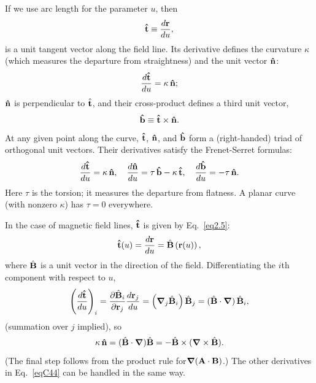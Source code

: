 \documentclass[aps,prb,twocolumn,groupedaddress,noshowpacs,checklength,amsmath]{revtex4-1}
\newcommand{\grad}{\mbox{\boldmath $\nabla$}}
\def\nhat{{\bf \hat n}}
\def\that{{\bf \hat t}}
\def\bhat{{\bf \hat b}}
\begin{document}
If we use arc length for the parameter $u$, then
\begin{equation}
\that \equiv \frac{d{\bf r}}{du},\label{eqC41}
\end{equation}
is a unit tangent vector along the field line.  Its derivative defines the curvature $\kappa$ (which measures the departure from straightness) and the unit vector $\nhat$:\cite{ATUV}
\begin{equation}
\frac{d\that}{du} = \kappa\,\nhat;\label{eqC42}
\end{equation}
$\nhat$ is perpendicular to $\hat {\bf t}$, and their cross-product defines a third unit vector,
\begin{equation}
\bhat \equiv \that \times \nhat.\label{eqC43}
\end{equation}
At any given point along the curve, $\that$, $\nhat$, and $\bhat$ form a (right-handed) triad of orthogonal unit vectors.  Their derivatives satisfy the Frenet-Serret formulas:\cite{TFSF}
\begin{equation}
\frac{d\that}{du} = \kappa\,\nhat,\quad \frac{d\nhat}{du} = \tau\, \bhat -\kappa \, \that,\quad \frac{d\bhat}{du} = -\tau \,\nhat.\label{eqC44}
\end{equation}
Here $\tau$ is the torsion; it measures the departure from flatness.  A planar curve (with nonzero $\kappa$) has $\tau = 0$ everywhere.

In the case of magnetic field lines, $\that$ is given by Eq.~\ref{eq2.5}:
\begin{equation}
\that(u) = \frac{d{\bf r}}{du} = \hat{\bf B}\left({\bf r}(u)\right),\label{eqC45}
\end{equation}
where $\hat{\bf B}$ is a unit vector in the direction of the field.  Differentiating the $i$th component with respect to $u$,
\begin{equation}
\left(\frac {d\that}{du}\right)_i = \frac{\partial\hat{\bf B}_i}{\partial{\bf r}_j}\frac{d{\bf r}_j}{du} = \left(\grad_j \hat{\bf B}_i\right)\hat{\bf B}_j = (\hat {\bf B} \cdot \grad)\,\hat {\bf B}_i,\label{eqC46}
\end{equation}
(summation over $j$ implied), so
\begin{equation}
\kappa\,\nhat = (\hat{\bf B}\cdot \grad)\hat {\bf B} = -\hat{\bf B} \times(\grad \times \hat{\bf B}).\label{eqC47}
\end{equation}
(The final step follows from the product rule for\linebreak $\grad({\bf A}\cdot {\bf B})$.)  The other derivatives in Eq.~\ref{eqC44} can be handled in the same way.
\end{document}
